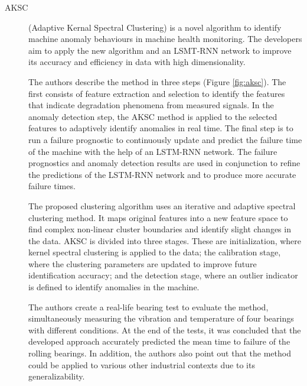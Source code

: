 \begin{description}
    \item[AKSC]\cite{Cheng.Zhu.ea_MachineHealthMonitoring_2019} (Adaptive Kernal Spectral Clustering) is a novel algorithm to identify machine anomaly behaviours in machine health monitoring. The developers aim to apply the new algorithm and an LSMT-RNN network to improve its accuracy and efficiency in data with high dimensionality. 
    
    The authors describe the method in three steps (Figure \ref{fig:aksc}). The first consists of feature extraction and selection to identify the features that indicate degradation phenomena from measured signals. In the anomaly detection step, the AKSC method is applied to the selected features to adaptively identify anomalies in real time. The final step is to run a failure prognostic to continuously update and predict the failure time of the machine with the help of an LSTM-RNN network. The failure prognostics and anomaly detection results are used in conjunction to refine the predictions of the LSTM-RNN network and to produce more accurate failure times.

    The proposed clustering algorithm uses an iterative and adaptive spectral clustering method. It maps original features into a new feature space to find complex non-linear cluster boundaries and identify slight changes in the data. AKSC is divided into three stages. These are initialization, where kernel spectral clustering is applied to the data; the calibration stage, where the clustering parameters are updated to improve future identification accuracy; and the detection stage, where an outlier indicator is defined to identify anomalies in the machine. 

    The authors create a real-life bearing test to evaluate the method, simultaneously measuring the vibration and temperature of four bearings with different conditions. At the end of the tests, it was concluded that the developed approach accurately predicted the mean time to failure of the rolling bearings. In addition, the authors also point out that the method could be applied to various other industrial contexts due to its generalizability.
\end{description}

